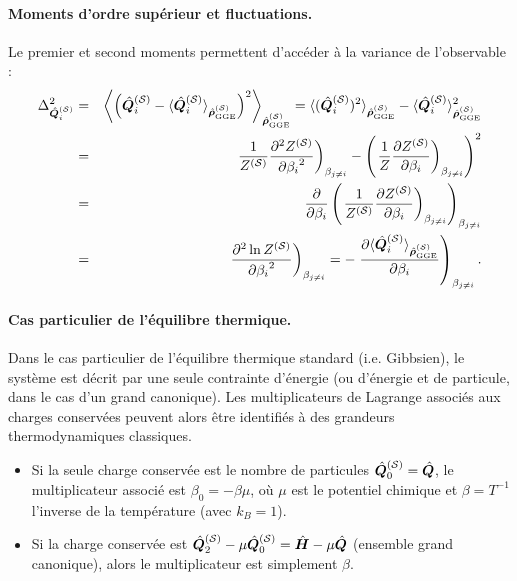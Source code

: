 \paragraph{Moments d’ordre supérieur et fluctuations.}
Le premier et second moments permettent d’accéder à la variance de l’observable :
\begin{eqnarray}
	\Delta_{\hat{\bm{Q}}_i^{(\mathcal{S})}}^2 &=&  	\left \langle \left (\hat{\bm{Q}}_i^{(\mathcal{S})} - \langle\hat{\bm{Q}}_i^{(\mathcal{S})} \rangle_{\hat{\bm{\rho}}^{(\mathcal{S})}_{\mathrm{GGE}}} \right )^2  \right \rangle_{\hat{\bm{\rho}}^{(\mathcal{S})}_{\mathrm{GGE}}}  = 	\langle(\hat{\bm{Q}}_i^{(\mathcal{S})})^2 \rangle_{\hat{\bm{\rho}}^{(\mathcal{S})}_{\mathrm{GGE}}}  -  \langle\hat{\bm{Q}}_i^{(\mathcal{S})} \rangle_{\hat{\bm{\rho}}^{(\mathcal{S})}_{\mathrm{GGE}}}^2 \nonumber  \\
		& = & \left . \frac{1}{Z^{(\mathcal{S})}} \frac{ \partial^2 Z^{(\mathcal{S})} }{ {\partial \beta_i}^2 }  \right )_{\beta_{j\neq i}} - \left ( \left . \frac{1}{Z}\frac{ \partial Z^{(\mathcal{S})} }{ \partial \beta_i }  \right )_{\beta_{j\neq i}}\right )^2     \nonumber\\
		&=&  \frac{\partial}{\partial \beta_i } \left ( \left . \frac{1}{Z^{(\mathcal{S})}} \frac{\partial Z^{(\mathcal{S})}}{\partial \beta_i }  \right )_{\beta_{j\neq i}}  \right )_{\beta_{j\neq i}} \nonumber \\
		&=&	  \left . \frac{\partial^2 \ln Z^{(\mathcal{S})}  }{{\partial \beta_i}^2 }  \right )_{\beta_{j\neq i}} =  - \left . 	\frac{\partial \langle\hat{\bm{Q}}_i^{(\mathcal{S})} \rangle_{\hat{\bm{\rho}}^{(\mathcal{S})}_{\mathrm{GGE}}} }{\partial \beta_i } \right )_{\beta_{j\neq i}}.	
\end{eqnarray}

\paragraph{Cas particulier de l’équilibre thermique.}

Dans le cas particulier de l’équilibre thermique standard (i.e. Gibbsien), le système est décrit par une seule contrainte d’énergie (ou d’énergie et de particule, dans le cas d’un grand canonique). Les multiplicateurs de Lagrange associés aux charges conservées peuvent alors être identifiés à des grandeurs thermodynamiques classiques.

\begin{itemize}[label=$\bullet$]
	\item Si la seule charge conservée est le nombre de particules $\hat{\bm{Q}}_0^{(\mathcal{S})} = \hat{\bm{Q}}$, le multiplicateur associé est $\beta_0 = -\beta \mu$, où $\mu$ est le potentiel chimique et $\beta = T^{-1}$ l’inverse de la température (avec $k_B = 1$).
	
	\item Si la charge conservée est $\hat{\bm{Q}}_2^{(\mathcal{S})}-\mu\hat{\bm{Q}}_0^{(\mathcal{S})}  = \hat{\bm{H}} - \mu \hat{\bm{Q}} $ (ensemble grand canonique), alors le multiplicateur est simplement $ \beta$.
\end{itemize}


